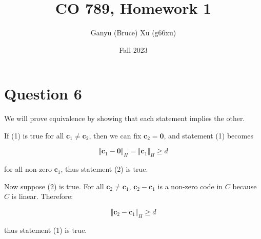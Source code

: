 \documentclass{article}
\title{CO 789, Homework 1}
\author{Ganyu (Bruce) Xu (g66xu)}
\date{Fall 2023}
\newcommand{\norm}[1]{\Vert {#1} \Vert}
\begin{document}

\section*{Question 6}
We will prove equivalence by showing that each statement implies the other.

If (1) is true for all $\mathbf{c}_1 \neq \mathbf{c}_2$, then we can fix $\mathbf{c}_2 = \mathbf{0}$, and statement (1) becomes 

$$
\norm{\mathbf{c}_1 - \mathbf{0}}_H = \norm{\mathbf{c}_1}_H \geq d
$$

for all non-zero $\mathbf{c}_1$, thus statement (2) is true.

Now suppose (2) is true. For all $\mathbf{c}_2 \neq \mathbf{c}_1$, $\mathbf{c}_2 - \mathbf{c}_1$ is a non-zero code in $C$ because $C$ is linear. Therefore:

$$
\norm{\mathbf{c}_2 - \mathbf{c}_1}_H \geq d
$$

thus statement (1) is true.
\end{document}
